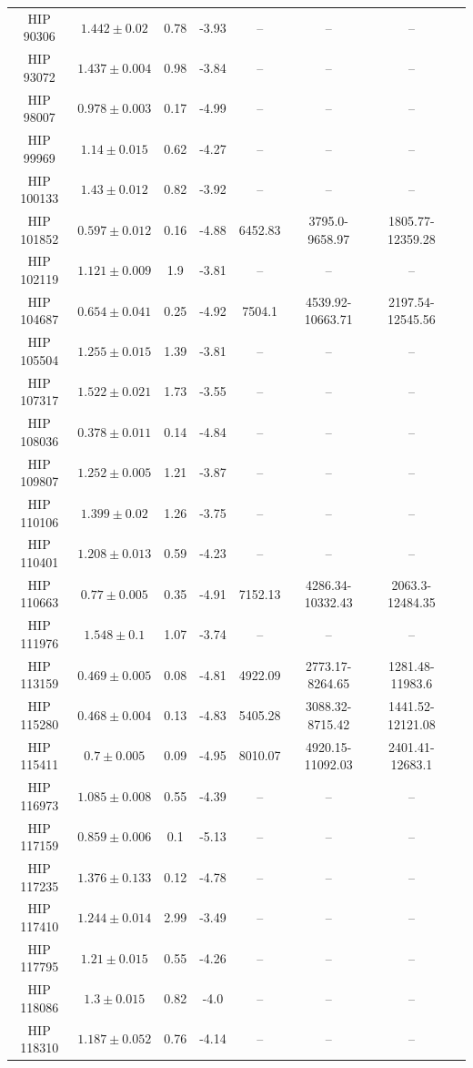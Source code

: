 \begin{longtable}{|c|c|c|c|c|c|c|c|}
HIP 90306 & $ 1.442 \pm 0.02 $ & 0.78 & -3.93 &-- &-- &-- \\
HIP 93072 & $ 1.437 \pm 0.004 $ & 0.98 & -3.84 &-- &-- &-- \\
HIP 98007 & $ 0.978 \pm 0.003 $ & 0.17 & -4.99 &-- &-- &-- \\
HIP 99969 & $ 1.14 \pm 0.015 $ & 0.62 & -4.27 &-- &-- &-- \\
HIP 100133 & $ 1.43 \pm 0.012 $ & 0.82 & -3.92 &-- &-- &-- \\
HIP 101852 & $ 0.597 \pm 0.012 $ & 0.16 & -4.88 & 6452.83 & 3795.0-9658.97 & 1805.77-12359.28 \\
HIP 102119 & $ 1.121 \pm 0.009 $ & 1.9 & -3.81 &-- &-- &-- \\
HIP 104687 & $ 0.654 \pm 0.041 $ & 0.25 & -4.92 & 7504.1 & 4539.92-10663.71 & 2197.54-12545.56 \\
HIP 105504 & $ 1.255 \pm 0.015 $ & 1.39 & -3.81 &-- &-- &-- \\
HIP 107317 & $ 1.522 \pm 0.021 $ & 1.73 & -3.55 &-- &-- &-- \\
HIP 108036 & $ 0.378 \pm 0.011 $ & 0.14 & -4.84 &-- &-- &-- \\
HIP 109807 & $ 1.252 \pm 0.005 $ & 1.21 & -3.87 &-- &-- &-- \\
HIP 110106 & $ 1.399 \pm 0.02 $ & 1.26 & -3.75 &-- &-- &-- \\
HIP 110401 & $ 1.208 \pm 0.013 $ & 0.59 & -4.23 &-- &-- &-- \\
HIP 110663 & $ 0.77 \pm 0.005 $ & 0.35 & -4.91 & 7152.13 & 4286.34-10332.43 & 2063.3-12484.35 \\
HIP 111976 & $ 1.548 \pm 0.1 $ & 1.07 & -3.74 &-- &-- &-- \\
HIP 113159 & $ 0.469 \pm 0.005 $ & 0.08 & -4.81 & 4922.09 & 2773.17-8264.65 & 1281.48-11983.6 \\
HIP 115280 & $ 0.468 \pm 0.004 $ & 0.13 & -4.83 & 5405.28 & 3088.32-8715.42 & 1441.52-12121.08 \\
HIP 115411 & $ 0.7 \pm 0.005 $ & 0.09 & -4.95 & 8010.07 & 4920.15-11092.03 & 2401.41-12683.1 \\
HIP 116973 & $ 1.085 \pm 0.008 $ & 0.55 & -4.39 &-- &-- &-- \\
HIP 117159 & $ 0.859 \pm 0.006 $ & 0.1 & -5.13 &-- &-- &-- \\
HIP 117235 & $ 1.376 \pm 0.133 $ & 0.12 & -4.78 &-- &-- &-- \\
HIP 117410 & $ 1.244 \pm 0.014 $ & 2.99 & -3.49 &-- &-- &-- \\
HIP 117795 & $ 1.21 \pm 0.015 $ & 0.55 & -4.26 &-- &-- &-- \\
HIP 118086 & $ 1.3 \pm 0.015 $ & 0.82 & -4.0 &-- &-- &-- \\
HIP 118310 & $ 1.187 \pm 0.052 $ & 0.76 & -4.14 &-- &-- &-- 
\label{tab:rhk}
\end{longtable}


